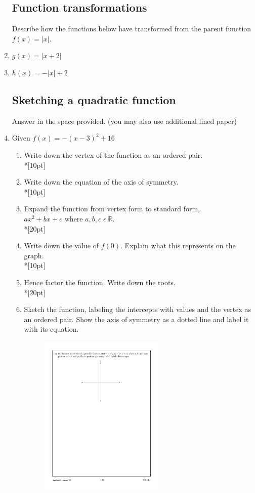 \documentclass[]{book}
\begin{document}
\begin{enumerate}
\subsection*{Function transformations}
Describe how the functions below have transformed from the parent function $f(x)=|x|$.
\item $g(x)=|x+2|$
\item $h(x)=-|x|+2$

\newpage

\subsection*{Sketching a quadratic function}
Answer in the space provided. (you may also use additional lined paper)
\item   Given $f(x)=-(x-3)^2+16$
\begin{enumerate}
    \item Write down the vertex of the function as an ordered pair.\\*[10pt]
    \item Write down the equation of the axis of symmetry.\\*[10pt]
    \item Expand the function from vertex form to standard form, $ax^2+bx+c \text{ where } a, b, c \;  \epsilon \; \mathbb{R}$.\\*[20pt]
    \item Write down the value of $f(0)$. Explain what this represents on the graph.\\*[10pt]
    \item Hence factor the function. Write down the roots.\\*[20pt]
    \item Sketch the function, labeling the intercepts with values and the vertex as an ordered pair. Show the axis of symmetry as a dotted line and label it with its equation.
\begin{figure}[!ht]
    \flushright
    \includegraphics[width=0.6\textwidth]{simple-axes.pdf}
\end{figure}


\end{enumerate}
\end{enumerate}
\end{document}
